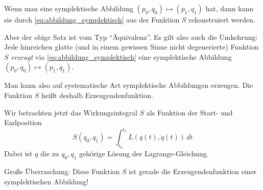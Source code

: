 Wenn man eine symplektische Abbildung $(p_0,q_0)\mapsto(p_1,q_1)$ hat, dann kann sie durch \eqref{eq:abbildung_symplektisch} aus der Funktion $S$ rekonstruiert werden.

Aber der obige Satz ist vom Typ \enquote{Äquivalenz}. Es gilt also auch die Umkehrung: Jede hinreichen glatte (und in einem gewissen Sinne nicht degenerierte) Funktion $S$ \emph{erzeugt} via \eqref{eq:abbildung_symplektisch} eine symplektische Abbildung $(p_0,q_0)\mapsto (p_1,q_1)$.

Man kann also auf systematische Art symplektische Abbildungen erzeugen. Die Funktion $S$ heißt deshalb Erzeugendenfunktion.





Wir betrachten jetzt das Wirkungsintegral $S$ als Funktion der Start- und Endposition
\begin{equation*}
S(q_0,q_1) = \int_{t_0}^{t_1} L(q(t),\dot q(t))\,dt 
\end{equation*}
Dabei ist $q$ die zu $q_0,q_1$ gehörige Lösung der Lagrange-Gleichung.




Große Überraschung: Diese Funktion $S$ ist gerade die Erzeugendenfunktion einer symplektischen Abbildung!

